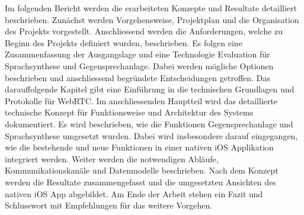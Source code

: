 Im folgenden Bericht werden die erarbeiteten Konzepte und Resultate detailliert beschrieben.
Zunächst werden Vorgehensweise, Projektplan und die Organisation des Projekts vorgestellt.
Anschliessend werden die Anforderungen, welche zu Beginn des Projekts definiert wurden, beschrieben.
Es folgen eine Zusammenfassung der Ausgangslage und eine Technologie Evaluation für Sprachsynthese und Gegensprechanlage.
Dabei werden mögliche Optionen beschrieben und anschliessend begründete Entscheidungen getroffen.
Das darauffolgende Kapitel gibt eine Einführung in die technischen Grundlagen und Protokolle für WebRTC.
Im anschliessenden Hauptteil wird das detaillierte technische Konzept für Funktionsweise und Architektur des Systems dokumentiert.
Es wird beschrieben, wie die Funktionen Gegensprechanlage und Sprachsynthese umgesetzt wurden.
Dabei wird insbesondere darauf eingegangen, wie die bestehende und neue Funktionen in einer nativen iOS Applikation integriert werden.
Weiter werden die notwendigen Abläufe, Kommunikationskanäle und Datenmodelle beschrieben.
Nach dem Konzept werden die Resultate zusammengefasst und die umgesetzten Ansichten des nativen iOS App abgebildet.
Am Ende der Arbeit stehen ein Fazit und Schlusswort mit Empfehlungen für das weitere Vorgehen.

\clearpage
